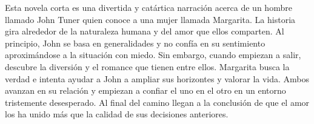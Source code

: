 
Esta novela corta es una divertida y catártica narración acerca de un hombre llamado John Tuner quien conoce a una mujer llamada Margarita. La historia gira alrededor de la naturaleza humana y del amor que ellos comparten. Al principio, John se basa en generalidades y no confía en su sentimiento aproximándose a la situación con miedo. Sin embargo, cuando empiezan a salir, descubre la diversión y el romance que tienen entre ellos. Margarita busca la verdad e intenta ayudar a John a ampliar sus horizontes y valorar la vida. Ambos avanzan en su relación y empiezan a confiar el uno en el otro en un entorno tristemente desesperado. Al final del camino llegan a la conclusión de que el amor los ha unido más que la calidad de sus decisiones anteriores.